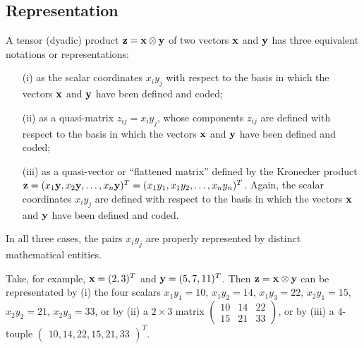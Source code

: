 \subsection{Representation}

A tensor (dyadic) product ${\bf z} = {\bf x} \otimes {\bf y}$ of two vectors ${\bf x}$ and ${\bf y}$
has three equivalent notations or representations:
\begin{itemize}
\item[(i)]
as the scalar coordinates $x_iy_j$ with respect to the basis in which the vectors ${\bf  x}$ and ${\bf y}$ have been defined and coded;
\item[(ii)]
as a quasi-matrix $z_{ij}  =x_iy_j$,
whose components $z_{ij}$ are  defined with respect to the basis in which the vectors ${\bf  x}$ and ${\bf y}$
have been defined and coded;
\item[(iii)]
as a quasi-vector or ``flattened matrix'' defined by the Kronecker product
${\bf z} = ({ x}_1  {\bf y}, { x}_2  {\bf y}, \ldots , { x}_n  {\bf y})^T=
({ x}_1  { y}_1, { x}_1  { y}_2, \ldots , { x}_n  { y}_n)^T
$. Again, the scalar coordinates $x_iy_j$ are defined
with respect to the basis in which the vectors ${\bf  x}$ and ${\bf y}$ have been defined and coded.
\end{itemize}
In all three cases, the pairs $x_i y_j$  are properly represented by distinct mathematical entities.

{\color{blue}
\bexample
Take, for example,
${\bf x}=(2,3)^T$
and
${\bf y}=(5,7,11)^T$.
Then ${\bf z} = {\bf x} \otimes {\bf y}$  can be representated by
(i) the four scalars
$x_1y_1=10$,
$x_1y_2=14$,
$x_1y_3=22$,
$x_2y_1=15$,
$x_2y_2=21$,
$x_2y_3=33$,
or by
(ii) a $2 \times 3$ matrix
$
\begin{pmatrix}
10&14&22\\
15&21&33
\end{pmatrix}
$,
or by
(iii) a $4$-touple
$
\begin{pmatrix}  10,14,22,15,21,33\end{pmatrix} ^T
$.
\eexample
}

